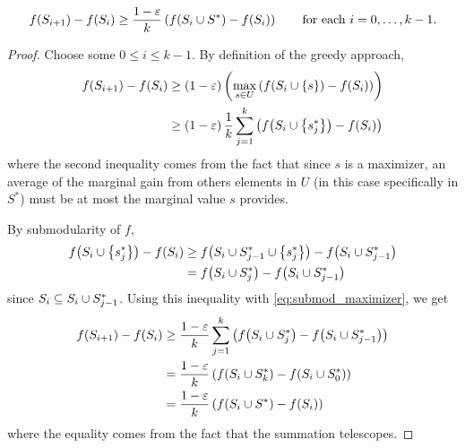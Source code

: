 \begin{claim}
    \begin{equation*}
        f \! \left( S_{i+1} \right) - f \! \left( S_i \right) \geq \frac{1-\varepsilon}{k} \left( f \! \left( S_i \cup S^{\ast} \right) - f \! \left( S_i \right) \right) 
        \quad \quad \textnormal{for each } i = 0, \ldots, k-1.
    \end{equation*}
    \label{claim:submod_ineq}
\end{claim}
\begin{proof} 
    Choose some $0 \leq i \leq k-1$. By definition of the greedy approach,
    \begin{align}
        \nonumber 
        f \! \left( S_{i+1} \right) - f \! \left( S_i \right) &\geq \left( 1-\varepsilon \right) \left( \max_{s \in U} \left( f \! \left( S_i \cup \left\{ s \right\} \right) - f \! \left( S_i \right) \right) \right)  \\
        \label{eq:submod_maximizer}                            
        &\geq \left( 1-\varepsilon \right) \frac{1}{k} \sum_{j=1}^{k} \left( f \! \left( S_i \cup \left\{ s_j^{\ast} \right\} \right) - f \! \left( S_i \right) \right)
    \end{align}
    where the second inequality comes from the fact that since $s$ is a maximizer, an average of the marginal gain from others elements in $U$ 
    (in this case specifically in $S^{\ast}$) must be at most the marginal value $s$ provides. 
    
    By submodularity of $f$, 
    \begin{align*}
        f \! \left( S_i \cup \left\{ s_j^{\ast} \right\} \right) - f \! \left( S_i \right) &\geq 
        f \! \left( S_i \cup S_{j-1}^{\ast} \cup  \left\{ s_j^{\ast} \right\} \right) - f \! \left( S_i \cup S_{j-1}^{\ast} \right) \\&= 
        f \! \left( S_i \cup  S_j^{\ast} \right) - f \! \left( S_i \cup S_{j-1}^{\ast} \right)
    \end{align*}
    since $S_i \subseteq S_i \cup S_{j-1}^{\ast}$. Using this inequality with \cref{eq:submod_maximizer}, we get
    \begin{align*}
        \f{S_{i+1}} - \f{S_i} &\geq \frac{1-\varepsilon}{k} \sum_{j=1}^{k} \lrp{\f{S_i \cup  S_j^{\ast}} - \f{S_i \cup S_{j-1}^{\ast}}}\\
        &= \frac{1-\varepsilon}{k} \lrp{\f{S_i \cup S_k^{\ast}} - \f{S_i \cup S_0^{\ast}}}\\
        &= \frac{1-\varepsilon}{k} \lrp{\f{S_i \cup S^{\ast}} - \f{S_i}}
    \end{align*}
    where the equality comes from the fact that the summation telescopes. 
\end{proof}

